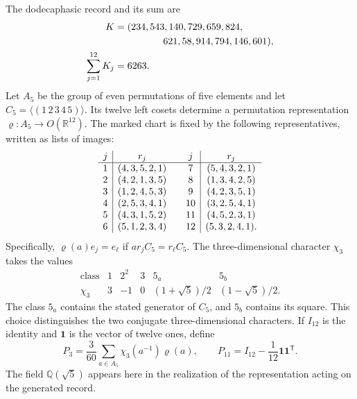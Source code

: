 The dodecaphasic record and its sum are
\begin{equation}
 \begin{split}
 K={}&(234,543,140,729,659,824,\\
     &\hspace{13mm}621,58,914,794,146,601),\\
 \sum_{j=1}^{12}K_j={}&6263.
 \end{split}
 \label{eq:leech-K}
\end{equation}
Let \(A_5\) be the group of even permutations of five elements and let
\(C_5=\langle(1\,2\,3\,4\,5)\rangle\). Its twelve left cosets
determine a permutation representation
\(\varrho:A_5\to O(\mathbb R^{12})\). The marked chart is fixed by
the following representatives, written as lists of images:
\[
\begin{array}{c|c@{\qquad}c|c}
j&r_j&j&r_j\\ \hline
1&(4,3,5,2,1)&7&(5,4,3,2,1)\\
2&(4,2,1,3,5)&8&(1,3,4,2,5)\\
3&(1,2,4,5,3)&9&(4,2,3,5,1)\\
4&(2,5,3,4,1)&10&(3,2,5,4,1)\\
5&(4,3,1,5,2)&11&(4,5,2,3,1)\\
6&(5,1,2,3,4)&12&(5,3,2,4,1).
\end{array}
\]
Specifically, \(\varrho(a)e_j=e_\ell\) if
\(ar_jC_5=r_\ell C_5\). The three-dimensional character \(\chi_3\) takes
the values
\[
\begin{array}{c|ccccc}
\text{class}&1&2^2&3&5_a&5_b\\ \hline
\chi_3&3&-1&0&(1+\sqrt5)/2&(1-\sqrt5)/2.
\end{array}
\]
The class \(5_a\) contains the stated generator of \(C_5\), and \(5_b\)
contains its square. This choice distinguishes the two conjugate
three-dimensional characters. If \(I_{12}\) is the identity and
\(\mathbf1\) is the vector of twelve ones, define
\begin{equation}
 P_3=\frac3{60}\sum_{a\in A_5}\chi_3(a^{-1})\varrho(a),
 \qquad
 P_{11}=I_{12}-\frac1{12}\mathbf1\mathbf1^{\mathsf T}.
 \label{eq:leech-projectors}
\end{equation}
The field \(\mathbb Q(\sqrt5)\) appears here in the realization of the
representation acting on the generated record.

